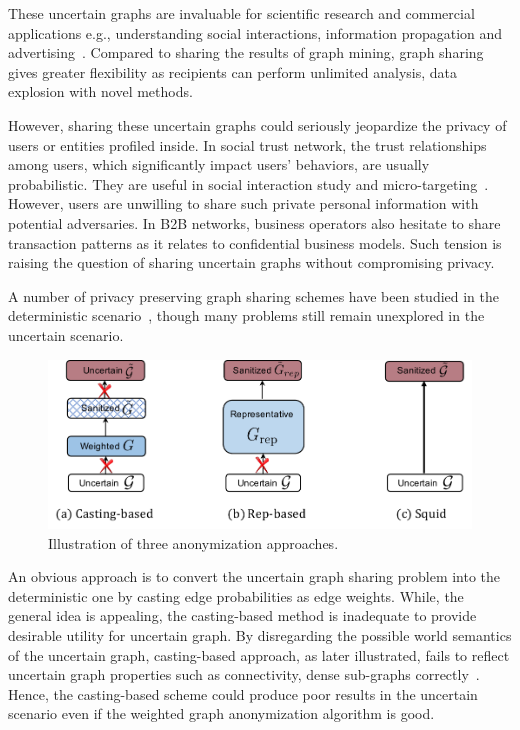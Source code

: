 These uncertain graphs are invaluable for scientific research and commercial applications e.g., understanding social interactions, information propagation and advertising~\cite{Kempe_Maximizing_2003,Cho_Friendship_2011}. 
Compared to sharing the results of graph mining, graph sharing gives greater flexibility as recipients can perform unlimited analysis, data explosion with novel methods.

However, sharing these uncertain graphs could seriously jeopardize the privacy of users or entities profiled inside.
In social trust network, the trust relationships among users, which significantly impact users' behaviors, are usually probabilistic. They are useful in social interaction study and micro-targeting~\cite{Kempe_Maximizing_2003}. However, users are unwilling to share such private personal information with potential adversaries. In B2B networks, business operators also hesitate to share transaction patterns as it relates to confidential business models. Such tension is raising the question of sharing uncertain graphs without compromising privacy. 

A number of privacy preserving graph sharing schemes have been studied in the deterministic scenario~\cite{Liu_Towards_2008,Ying_Randomizing_2008,Wang2011,Liu_Privacy_2009,Nguyen_Anonymizing_2015,Sala_Sharing_2011,Xiao_Differentially_2014,lee2011}, though many problems still remain unexplored in the uncertain scenario.
\begin{figure}[!htb]
  \centering
  \includegraphics[width=0.9\linewidth]{ill/methods.pdf}
  \caption{Illustration of three anonymization approaches.}
\end{figure}

An obvious approach is to convert the uncertain graph sharing problem into the deterministic one by casting edge probabilities as edge weights. 
While, the general idea is appealing, the casting-based method is inadequate to provide desirable utility for uncertain graph. 
By disregarding the possible world semantics of the uncertain graph, casting-based approach, as later illustrated, fails to reflect uncertain graph properties such as connectivity, dense sub-graphs correctly~\cite{Zhao_Detecting_2014,Hua_Probabilistic_2010}. 
Hence, the casting-based scheme could produce poor results in the uncertain scenario even if the weighted graph anonymization algorithm is good. 

